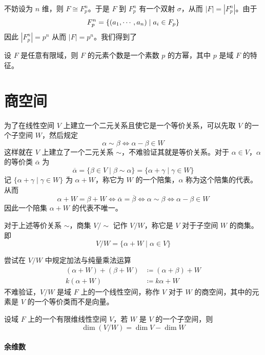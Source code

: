 不妨设为 $n$ 维，则 $F \cong F_p^n$。于是 $F$ 到 $F_p^n$ 有一个双射 $\sigma$，从而 $|F| = |F_p^n|$。由于
\[ F_p^n = \{ (a_1,\cdots,a_n) \mid a_i \in F_p \} \]
因此 $|F_p^n| = p^n$ 从而 $|F| = p^n$。我们得到了

\begin{theorem}
	设 $F$ 是任意有限域，则 $F$ 的元素个数是一个素数 $p$ 的方幂，其中 $p$ 是域 $F$ 的特征。
\end{theorem}

\section{商空间}

为了在线性空间 $V$ 上建立一个二元关系且使它是一个等价关系，可以先取 $V$ 的一个子空间 $W$，然后规定
\[ \alpha \sim \beta \Leftrightarrow \alpha - \beta \in W \]
这样就在 $V$ 上建立了一个二元关系 $\sim$，不难验证其就是等价关系。对于 $\alpha \in V$，$\alpha$ 的等价类 $\overline{\alpha}$ 为
\[ \overline{\alpha} = \{ \beta \in V \mid \beta \sim \alpha \} = \{ \alpha + \gamma \mid \gamma \in W \} \]
记 $\{ \alpha + \gamma \mid \gamma \in W \}$ 为 $\alpha + W$，称它为 $W$ 的一个陪集，$\alpha$ 称为这个陪集的代表。从而
\[ \alpha + W = \beta + W \Leftrightarrow \overline{\alpha} = \overline{\beta} \Leftrightarrow \alpha \sim \beta \Leftrightarrow \alpha - \beta \in W \]
因此一个陪集 $\alpha + W$ 的代表不唯一。

对于上述等价关系 $\sim$，商集 $V/\sim$ 记作 $V/W$，称它是 $V$ 对于子空间 $W$ 的商集。即
\[ V/W = \{ \alpha + W \mid \alpha \in V \} \]

尝试在 $V/W$ 中规定加法与纯量乘法运算
\begin{equation*}
	\begin{aligned}
		(\alpha + W) + (\beta + W) & \coloneqq (\alpha + \beta) + W \\
		k(\alpha + W)              & \coloneqq k\alpha + W
	\end{aligned}
\end{equation*}
不难验证，$V/W$ 是域 $F$ 上的一个线性空间，称作 $V$ 对于 $W$ 的商空间，其中的元素是 $V$ 的一个等价类而不是向量。

\begin{theorem}
	设域 $F$ 上的一个有限维线性空间 $V$，若 $W$ 是 $V$ 的一个子空间，则
	\[ \dim(V/W) = \dim V - \dim W \]
\end{theorem}

\paragraph{余维数}

